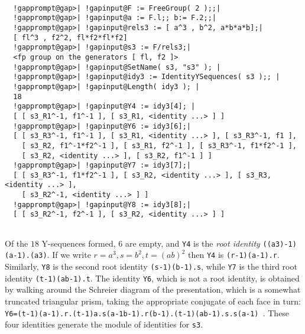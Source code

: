 \documentclass[a4paper,11pt]{report}
\begin{document}
{{ 
\begin{Verbatim}[commandchars=!@|,fontsize=\small,frame=single,label=Example]
  
  !gapprompt@gap>| !gapinput@F := FreeGroup( 2 );;|
  !gapprompt@gap>| !gapinput@a := F.l;; b:= F.2;;|
  !gapprompt@gap>| !gapinput@rels3 := [ a^3 , b^2, a*b*a*b];|
  [ fl^3 , f2^2, fl*f2*fl*f2] 
  !gapprompt@gap>| !gapinput@s3 := F/rels3;|
  <fp group on the generators [ fl, f2 ]> 
  !gapprompt@gap>| !gapinput@SetName( s3, "s3" ); |
  !gapprompt@gap>| !gapinput@idy3 := IdentityYSequences( s3 );; |
  !gapprompt@gap>| !gapinput@Length( idy3 ); |
  18
  !gapprompt@gap>| !gapinput@Y4 := idy3[4]; |
  [ [ s3_R1^-1, f1^-1 ], [ s3_R1, <identity ...> ] ]
  !gapprompt@gap>| !gapinput@Y6 := idy3[6];|
  [ [ s3_R3^-1, f1^-1 ], [ s3_R1, <identity ...> ], [ s3_R3^-1, f1 ],
    [ s3_R2, f1^-1*f2^-1 ], [ s3_R1, f2^-1 ], [ s3_R3^-1, f1*f2^-1 ],
    [ s3_R2, <identity ...> ], [ s3_R2, f1^-1 ] ]
  !gapprompt@gap>| !gapinput@Y7 := idy3[7];|
  [ [ s3_R3^-1, f1*f2^-1 ], [ s3_R2, <identity ...> ], [ s3_R3, <identity ...> ],
    [ s3_R2^-1, <identity ...> ] ]
  !gapprompt@gap>| !gapinput@Y8 := idy3[8];|
  [ [ s3_R2^-1, f2^-1 ], [ s3_R2, <identity ...> ] ]
  
\end{Verbatim}
 Of the $18$ Y-sequences formed, $6$ are empty, and \texttt{Y4} is the \emph{root identity} \texttt{((a\texttt{}3)\texttt{}-1)\texttt{}(a\texttt{}-1).(a\texttt{}3)}. If we write $r=a^3, s=b^2, t=(ab)^2$ then \texttt{Y4} is \texttt{(r\texttt{}-1)\texttt{}(a\texttt{}-1).r}. Similarly, \texttt{Y8} is the second root identity \texttt{(s\texttt{}-1)\texttt{}(b\texttt{}-1).s}, while \texttt{Y7} is the third root identity \texttt{(t\texttt{}-1)\texttt{}(ab\texttt{}-1).t}. The identity \texttt{Y6}, which is not a root identity, is obtained by walking around the Schreier
diagram of the presentation, which is a somewhat truncated triangular prism,
taking the appropriate conjugate of each face in turn: \texttt{ Y6=(t\texttt{}-1)\texttt{}(a\texttt{}-1).r.(t\texttt{}-1)\texttt{}a.s\texttt{}(a\texttt{}-1b\texttt{}-1).r\texttt{}(b\texttt{}-1).(t\texttt{}-1)\texttt{}(ab\texttt{}-1).s.s\texttt{}(a\texttt{}-1) }. These four identities generate the module of identities for \texttt{s3}. 

}}
\end{document}
